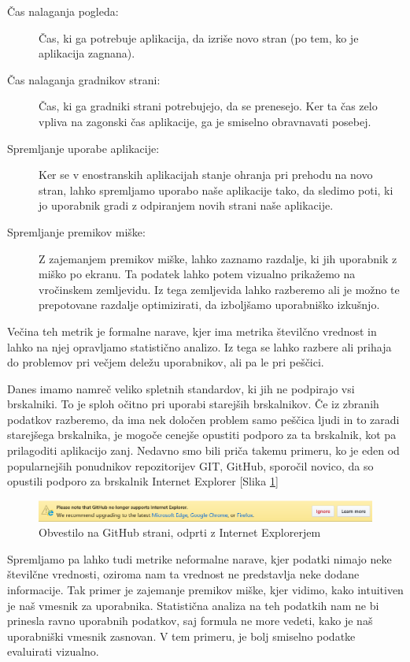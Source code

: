 \documentclass[a4paper, 12pt]{book}
\begin{document}
\begin{description}
	\item[Čas nalaganja pogleda:] Čas, ki ga potrebuje aplikacija, da izriše novo stran (po tem, ko je aplikacija zagnana).
	\item[Čas nalaganja gradnikov strani:] Čas, ki ga gradniki strani potrebujejo, da se prenesejo. Ker ta čas zelo vpliva na zagonski čas aplikacije, ga je smiselno obravnavati posebej.
	\item[Spremljanje uporabe aplikacije:] Ker se v enostranskih aplikacijah stanje ohranja pri prehodu na novo stran, lahko spremljamo uporabo naše aplikacije tako, da sledimo poti, ki jo uporabnik gradi z odpiranjem novih strani naše aplikacije.
	\item[Spremljanje premikov miške:] Z zajemanjem premikov miške, lahko zaznamo razdalje, ki jih uporabnik  z miško po ekranu. Ta podatek lahko potem vizualno prikažemo na vročinskem zemljevidu. Iz tega zemljevida lahko razberemo ali je možno te prepotovane razdalje optimizirati, da izboljšamo uporabniško izkušnjo.
\end{description}

Večina teh metrik je formalne narave, kjer ima metrika številčno vrednost in lahko na njej opravljamo statistično analizo. Iz tega se lahko razbere ali prihaja do problemov pri večjem deležu uporabnikov, ali pa le pri peščici.

Danes imamo namreč veliko spletnih standardov, ki jih ne podpirajo vsi brskalniki. To je sploh očitno pri uporabi starejših brskalnikov. Če iz zbranih podatkov razberemo, da ima nek določen problem samo peščica ljudi in to zaradi starejšega brskalnika, je mogoče cenejše opustiti podporo za ta brskalnik, kot pa prilagoditi aplikacijo zanj. Nedavno smo bili priča takemu primeru, ko je eden od popularnejših ponudnikov repozitorijev GIT, GitHub, sporočil novico, da so opustili podporo za brskalnik Internet Explorer [Slika \ref{img:github_ie}]

\begin{figure}[h]
	\begin{center}
		\includegraphics[width=1\textwidth]{github_end_support.png}
	\end{center}
	\caption{Obvestilo na GitHub strani, odprti z Internet Explorerjem}
	\label{img:github_ie}
\end{figure}

Spremljamo pa lahko tudi metrike neformalne narave, kjer podatki nimajo neke številčne vrednosti, oziroma nam ta vrednost ne predstavlja neke dodane informacije. Tak primer je zajemanje premikov miške, kjer vidimo, kako intuitiven je naš vmesnik za uporabnika. Statistična analiza na teh podatkih nam ne bi prinesla ravno uporabnih podatkov, saj formula ne more vedeti, kako je naš uporabniški vmesnik zasnovan. V tem primeru, je bolj smiselno podatke evaluirati vizualno.
\end{document}
